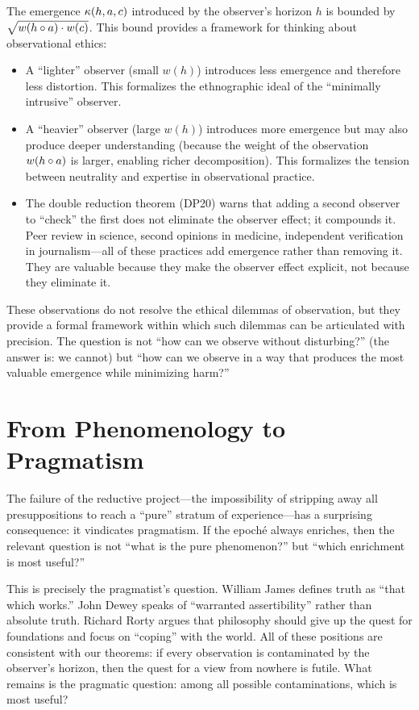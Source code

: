 The emergence $\kappa(h, a, c)$ introduced by the observer's horizon
$h$ is bounded by $\sqrt{w(h \circ a) \cdot w(c)}$. This bound
provides a framework for thinking about observational ethics:
\begin{itemize}
\item A ``lighter'' observer (small $w(h)$) introduces less emergence
and therefore less distortion. This formalizes the ethnographic ideal of
the ``minimally intrusive'' observer.
\item A ``heavier'' observer (large $w(h)$) introduces more emergence
but may also produce deeper understanding (because the weight of the
observation $w(h \circ a)$ is larger, enabling richer decomposition).
This formalizes the tension between neutrality and expertise in
observational practice.
\item The double reduction theorem (DP20) warns that adding a second
observer to ``check'' the first does not eliminate the observer effect;
it compounds it. Peer review in science, second opinions in medicine,
independent verification in journalism---all of these practices add
emergence rather than removing it. They are valuable because they make
the observer effect explicit, not because they eliminate it.
\end{itemize}

These observations do not resolve the ethical dilemmas of observation,
but they provide a formal framework within which such dilemmas can be
articulated with precision. The question is not ``how can we observe
without disturbing?'' (the answer is: we cannot) but ``how can we
observe in a way that produces the most valuable emergence while
minimizing harm?''

\section{From Phenomenology to Pragmatism}

The failure of the reductive project---the impossibility of stripping
away all presuppositions to reach a ``pure'' stratum of experience---has
a surprising consequence: it vindicates pragmatism. If the epoch\'e
always enriches, then the relevant question is not ``what is the pure
phenomenon?'' but ``which enrichment is most useful?''

This is precisely the pragmatist's question. William James defines truth
as ``that which works.'' John Dewey speaks of ``warranted
assertibility'' rather than absolute truth. Richard Rorty argues that
philosophy should give up the quest for foundations and focus on
``coping'' with the world. All of these positions are consistent with
our theorems: if every observation is contaminated by the observer's
horizon, then the quest for a view from nowhere is futile. What remains
is the pragmatic question: among all possible contaminations, which is
most useful?

